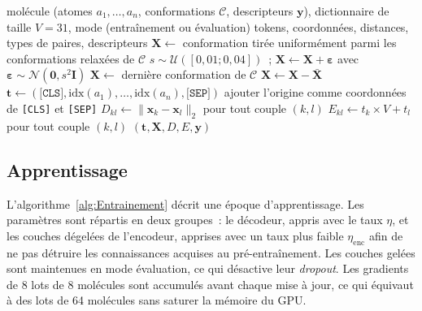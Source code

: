 \begin{algorithm}
   \caption{Préparation d'un exemple au format Uni-Mol}
   \label{alg:Exemple}
   \begin{algorithmic}[1]
      \REQUIRE molécule (atomes $a_1, \ldots, a_n$, conformations $\mathcal{C}$, descripteurs $\mathbf{y}$), dictionnaire de taille $V = 31$, mode (entraînement ou évaluation)
      \ENSURE tokens, coordonnées, distances, types de paires, descripteurs
         \STATE $\mathbf{X} \leftarrow$ conformation tirée uniformément parmi les conformations relaxées de $\mathcal{C}$
         \STATE $s \sim \mathcal{U}([0{,}01 ; 0{,}04])$~; $\mathbf{X} \leftarrow \mathbf{X} + \boldsymbol{\varepsilon}$ avec $\boldsymbol{\varepsilon} \sim \mathcal{N}(\mathbf{0}, s^2 \mathbf{I})$
      \ELSE
         \STATE $\mathbf{X} \leftarrow$ dernière conformation de $\mathcal{C}$ 
      \ENDIF
      \STATE $\mathbf{X} \leftarrow \mathbf{X} - \bar{\mathbf{X}}$ 
      \STATE $\mathbf{t} \leftarrow (\texttt{[CLS]}, \mathrm{idx}(a_1), \ldots, \mathrm{idx}(a_n), \texttt{[SEP]})$
      \STATE ajouter l'origine comme coordonnées de \texttt{[CLS]} et \texttt{[SEP]}
      \STATE $D_{kl} \leftarrow \lVert \mathbf{x}_k - \mathbf{x}_l \rVert_2$ pour tout couple $(k, l)$
      \STATE $E_{kl} \leftarrow t_k \times V + t_l$ pour tout couple $(k, l)$
      \RETURN $(\mathbf{t}, \mathbf{X}, D, E, \mathbf{y})$
   \end{algorithmic}
\end{algorithm}

\subsection{Apprentissage}

L'algorithme~\ref{alg:Entrainement} décrit une époque d'apprentissage.
Les paramètres sont répartis en deux groupes~: le décodeur, appris avec le taux $\eta$, et les couches dégelées de l'encodeur, apprises avec un taux plus faible $\eta_{\mathrm{enc}}$ afin de ne pas détruire les connaissances acquises au pré-entraînement.
Les couches gelées sont maintenues en mode évaluation, ce qui désactive leur \emph{dropout}.
Les gradients de 8 lots de 8 molécules sont accumulés avant chaque mise à jour, ce qui équivaut à des lots de 64 molécules sans saturer la mémoire du GPU.

